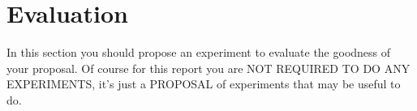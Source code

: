 \section{Evaluation}\label{sec:evaluation}

In this section you should propose an experiment to evaluate the goodness of your proposal. Of course for this report you are NOT REQUIRED TO DO ANY EXPERIMENTS, it's just a PROPOSAL of experiments that may be useful to do.